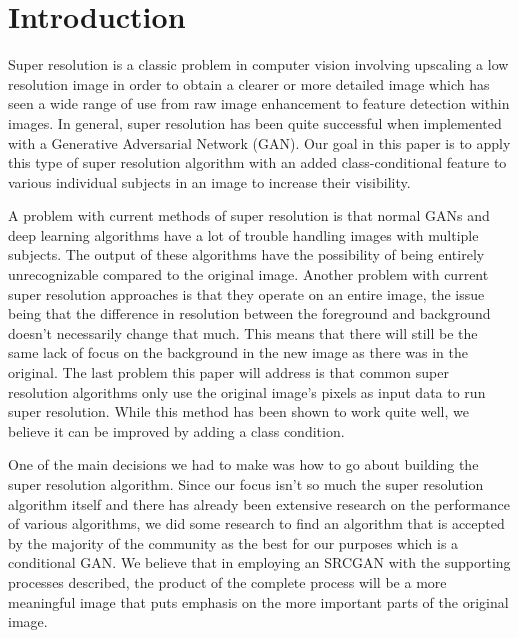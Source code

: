 \section{Introduction}

Super resolution is a classic problem in computer vision involving upscaling a
low resolution image in order to obtain a clearer or more detailed image which
has seen a wide range of use from raw image enhancement to feature detection
within images\cite{Chen,Dong2016,Ledig}. In general, super resolution has been quite successful
when implemented with a Generative Adversarial Network (GAN)\cite{Chen}. Our goal in
this paper is to apply this type of super resolution algorithm with an added
class-conditional feature to various individual subjects in an image to increase
their visibility.

A problem with current methods of super resolution is that normal GANs and deep
learning algorithms have a lot of trouble handling images with multiple
subjects. The output of these algorithms have the possibility of being entirely
unrecognizable compared to the original image\cite{Goodfellow2017}. 
Another problem with current
super resolution approaches is that they operate on an entire image, the issue
being that the difference in resolution between the foreground and background
doesn’t necessarily change that much. This means that there will still be the
same lack of focus on the background in the new image as there was in the
original. The last problem this paper will address is that common super
resolution algorithms only use the original image’s pixels as input data to run
super resolution. While this method has been shown to work quite well, we
believe it can be improved by adding a class condition.

One of the main decisions we had to make was how to go about building the super
resolution algorithm. Since our focus isn’t so much the super resolution
algorithm itself and there has already been extensive research on the
performance of various algorithms, we did some research to find an algorithm
that is accepted by the majority of the community as the best for our purposes
which is a conditional GAN\cite{Chen}. We believe that in employing an SRCGAN with the
supporting processes described, the product of the complete process will be a
more meaningful image that puts emphasis on the more important parts of the
original image.

